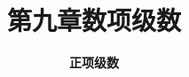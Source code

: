 


\title[数学分析]{\texorpdfstring{\LARGE \bfseries 第九章\quad 数项级数}{第九章 数项级数}} %
\author[正项级数] %
{\Large \bfseries 正项级数}
\date{}





\begin{frame}

\titlepage %

\end{frame}





